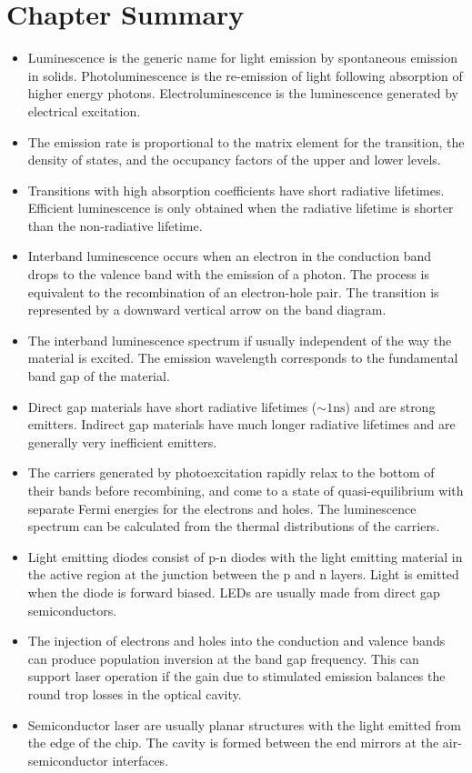\documentclass[12pt]{book}
\begin{document}
{\section*{Chapter Summary}
\begin{shaded}
\begin{itemize}
  \item Luminescence is the generic name for light emission by spontaneous emission in solids. Photoluminescence is the re-emission of light following absorption of higher energy photons. Electroluminescence is the luminescence generated by electrical excitation.
  \item The emission rate is proportional to the matrix element for the transition, the density of states, and the occupancy factors of the upper and lower levels.
  \item Transitions with high absorption coefficients have short radiative lifetimes. Efficient luminescence is only obtained when the radiative lifetime is shorter than the non-radiative lifetime.
  \item Interband luminescence occurs when an electron in the conduction band drops to the valence band with the emission of a photon. The process is equivalent to the recombination of an electron-hole pair. The transition is represented by a downward vertical arrow on the band diagram.
  \item The interband luminescence spectrum if usually independent of the way the material is excited. The emission wavelength corresponds to the fundamental band gap of the material.
  \item Direct gap materials have short radiative lifetimes ($\sim 1 \mathrm{ns}$) and are strong emitters. Indirect gap materials have much longer radiative lifetimes and are generally very inefficient emitters.
  \item The carriers generated by photoexcitation rapidly relax to the bottom of their bands before recombining, and come to a state of quasi-equilibrium with separate Fermi energies for the electrons and holes. The luminescence spectrum can be calculated from the thermal distributions of the carriers.
  \item Light emitting diodes consist of p-n diodes with the light emitting material in the  active region at the junction between the p and n layers. Light is emitted when the diode is forward biased. LEDs are usually made from direct gap semiconductors.
  \item The injection of electrons and holes into the conduction and valence bands can produce population inversion at the band gap frequency. This can support laser operation if the gain due to stimulated emission balances the round trop losses in the optical cavity.
  \item Semiconductor laser are usually planar structures with the light emitted from the edge of the chip. The cavity is formed between the end mirrors at the air-semiconductor interfaces.
\end{itemize}
\end{shaded}

}
\end{document}

